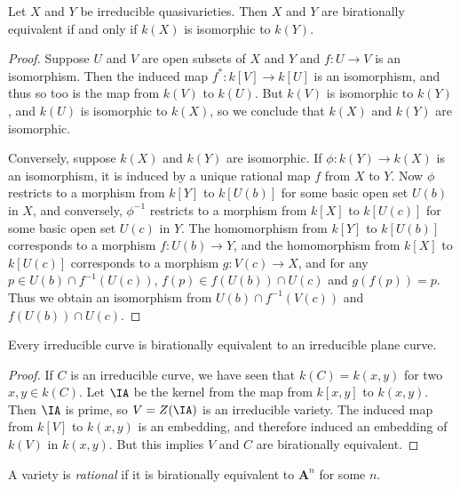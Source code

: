\begin{theorem}
    Let $X$ and $Y$ be irreducible quasivarieties. Then $X$ and $Y$ are birationally equivalent if and only if $k(X)$ is isomorphic to $k(Y)$.
\end{theorem}
\begin{proof}
    Suppose $U$ and $V$ are open subsets of $X$ and $Y$ and $f: U \to V$ is an isomorphism. Then the induced map $f^*: k[V] \to k[U]$ is an isomorphism, and thus so too is the map from $k(V)$ to $k(U)$. But $k(V)$ is isomorphic to $k(Y)$, and $k(U)$ is isomorphic to $k(X)$, so we conclude that $k(X)$ and $k(Y)$ are isomorphic.

    Conversely, suppose $k(X)$ and $k(Y)$ are isomorphic. If $\phi: k(Y) \to k(X)$ is an isomorphism, it is induced by a unique rational map $f$ from $X$ to $Y$. Now $\phi$ restricts to a morphism from $k[Y]$ to $k[U(b)]$ for some basic open set $U(b)$ in $X$, and conversely, $\phi^{-1}$ restricts to a morphism from $k[X]$ to $k[U(c)]$ for some basic open set $U(c)$ in $Y$. The homomorphism from $k[Y]$ to $k[U(b)]$ corresponds to a morphism $f: U(b) \to Y$, and the homomorphism from $k[X]$ to $k[U(c)]$ corresponds to a morphism $g: V(c) \to X$, and for any $p \in U(b) \cap f^{-1}(U(c))$, $f(p) \in f(U(b)) \cap U(c)$ and $g(f(p)) = p$. Thus we obtain an isomorphism from $U(b) \cap f^{-1}(V(c))$ and $f(U(b)) \cap U(c)$.
\end{proof}

\begin{corollary}
    Every irreducible curve is birationally equivalent to an irreducible plane curve.
\end{corollary}
\begin{proof}
    If $C$ is an irreducible curve, we have seen that $k(C) = k(x,y)$ for two $x,y \in k(C)$. Let $\IA$ be the kernel from the map from $k[x,y]$ to $k(x,y)$. Then $\IA$ is prime, so $V = Z(\IA)$ is an irreducible variety. The induced map from $k[V]$ to $k(x,y)$ is an embedding, and therefore induced an embedding of $k(V)$ in $k(x,y)$. But this implies $V$ and $C$ are birationally equivalent.
\end{proof}

A variety is \emph{rational} if it is birationally equivalent to $\mathbf{A}^n$ for some $n$.

